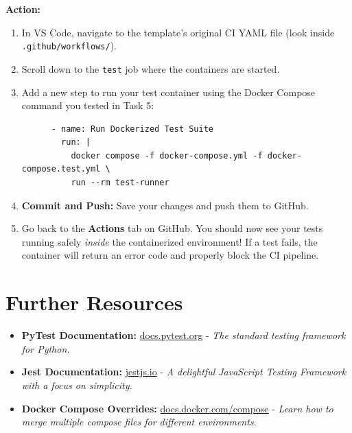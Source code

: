 \documentclass[a4paper,12pt]{article}
\begin{document}
\vspace{0.3cm}
\textbf{Action:}
\begin{enumerate}
    \item In VS Code, navigate to the template's original CI YAML file (look inside \texttt{.github/workflows/}).
    \item Scroll down to the \texttt{test} job where the containers are started.
    \item Add a new step to run your test container using the Docker Compose command you tested in Task 5:
    \begin{verbatim}
      - name: Run Dockerized Test Suite
        run: |
          docker compose -f docker-compose.yml -f docker-compose.test.yml \
          run --rm test-runner
    \end{verbatim}
    \item \textbf{Commit and Push:} Save your changes and push them to GitHub. 
    \item Go back to the \textbf{Actions} tab on GitHub. You should now see your tests running safely \textit{inside} the containerized environment! If a test fails, the container will return an error code and properly block the CI pipeline.
\end{enumerate}


\section*{Further Resources}

\begin{itemize}
    \item \textbf{PyTest Documentation:} \href{https://docs.pytest.org/en/7.3.x/}{docs.pytest.org} - \textit{The standard testing framework for Python.}
    \item \textbf{Jest Documentation:} \href{https://jestjs.io/}{jestjs.io} - \textit{A delightful JavaScript Testing Framework with a focus on simplicity.}
    \item \textbf{Docker Compose Overrides:} \href{https://docs.docker.com/compose/compose-file/13-merge/}{docs.docker.com/compose} - \textit{Learn how to merge multiple compose files for different environments.}
\end{itemize}
\end{document}
